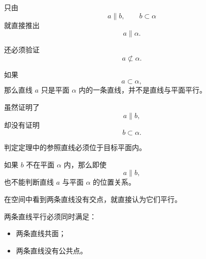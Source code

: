 \begin{trapbox}
	\begin{description}[
			style=nextline,
			leftmargin=2.8em,
			labelsep=0.5em,
			itemsep=0.38em
		]
		\item[\textbf{\textcolor{CTrap}{易错点一：漏掉目标线不在平面内}}]

		      只由
		      \[
			      a\parallel b,
			      \qquad
			      b\subset\alpha
		      \]
		      就直接推出
		      \[
			      a\parallel\alpha.
		      \]

		\item[\textbf{正确理解：}]

		      还必须验证
		      \[
			      a\not\subset\alpha.
		      \]

		      如果
		      \[
			      a\subset\alpha,
		      \]
		      那么直线 $a$ 只是平面 $\alpha$ 内的一条直线，并不是直线与平面平行。
	\end{description}

	\medskip
	\begin{description}[
			style=nextline,
			leftmargin=2.8em,
			labelsep=0.5em,
			itemsep=0.38em
		]
		\item[\textbf{\textcolor{CTrap}{易错点二：参照线不在目标平面内}}]

		      虽然证明了
		      \[
			      a\parallel b,
		      \]
		      却没有证明
		      \[
			      b\subset\alpha.
		      \]

		\item[\textbf{正确理解：}]

		      判定定理中的参照直线必须位于目标平面内。

		      如果 $b$ 不在平面 $\alpha$ 内，那么即使
		      \[
			      a\parallel b,
		      \]
		      也不能判断直线 $a$ 与平面 $\alpha$ 的位置关系。
	\end{description}

	\medskip
	\begin{description}[
			style=nextline,
			leftmargin=2.8em,
			labelsep=0.5em,
			itemsep=0.38em
		]
		\item[\textbf{\textcolor{CTrap}{易错点三：把异面直线当作平行直线}}]

		      在空间中看到两条直线没有交点，就直接认为它们平行。

		\item[\textbf{正确理解：}]

		      两条直线平行必须同时满足：

		      \begin{itemize}[leftmargin=*, itemsep=0.25em]
			      \item 两条直线共面；
			      \item 两条直线没有公共点。
		      \end{itemize}


\end{description}
\end{trapbox}
